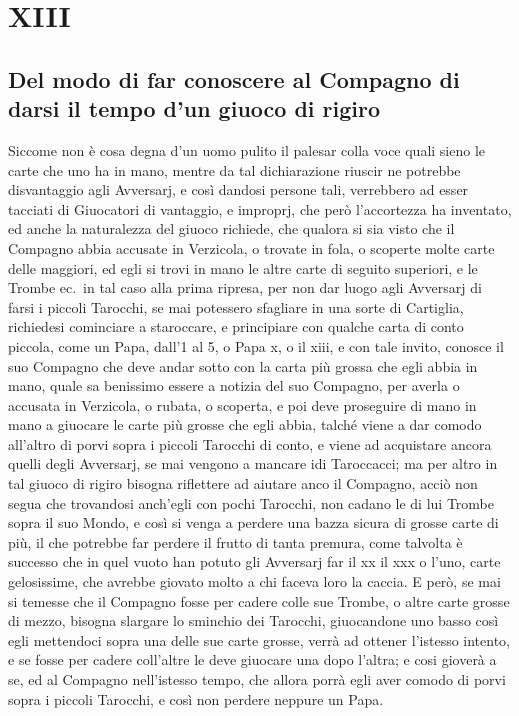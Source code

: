 \documentclass[11pt,a6paper]{article}
\begin{document}
\section{XIII}
\subsection*{Del modo di far conoscere al Compagno
di darsi il tempo d'un giuoco di rigiro}

Siccome non è cosa degna d'un uomo
pulito il palesar colla voce quali sieno le carte che uno ha in mano, mentre da tal dichiarazione riuscir ne potrebbe disvantaggio agli Avversarj, e così dandosi persone tali, verrebbero ad esser tacciati di Giuocatori di vantaggio, e improprj, che però l'accortezza ha inventato, ed anche la naturalezza del giuoco richiede, che qualora si sia visto che il Compagno abbia accusate in Verzicola, o trovate in fola, o scoperte molte carte delle maggiori, ed egli si trovi in mano le altre carte di seguito superiori, e le Trombe ec.\ in tal caso alla prima ripresa, per non dar luogo agli Avversarj di
farsi i piccoli Tarocchi, se mai potessero sfagliare in una sorte di Cartiglia, richiedesi cominciare a staroccare, e principiare con qualche carta di conto piccola, come un Papa, dall'1 al 5, o Papa x, o il xiii, e con tale invito, conosce il suo Compagno che deve andar sotto con la carta più grossa che egli abbia in mano, quale sa benissimo essere a notizia del suo Compagno, per averla o accusata in Verzicola, o rubata, o scoperta, e poi deve proseguire di mano in mano a giuocare le carte più grosse che egli abbia, talché viene a dar comodo all'altro di porvi sopra i piccoli Tarocchi di conto, e viene ad acquistare ancora quelli degli Avversarj, se mai vengono a mancare idi Taroccacci; ma per altro in tal giuoco di rigiro bisogna riflettere ad aiutare anco il Compagno, acciò non segua che trovandosi anch'egli con pochi Tarocchi, non cadano le di lui Trombe sopra il suo Mondo, e così si venga a perdere una bazza sicura di grosse carte di più, il che potrebbe far perdere il frutto di tanta premura, come talvolta è successo che in quel vuoto han potuto gli Avversarj
far il xx il xxx o l'uno, carte gelosissime, che avrebbe giovato molto a chi 
faceva loro la caccia. E però, se mai si 
temesse che il Compagno fosse per cadere colle sue Trombe, o altre carte grosse 
di mezzo, bisogna slargare lo sminchio 
dei Tarocchi, giuocandone uno basso 
così egli mettendoci sopra una delle sue 
carte grosse, verrà ad ottener l'istesso intento, e se fosse per cadere coll'altre le 
deve giuocare una dopo l'altra; e cosi 
gioverà a se, ed al Compagno nell'istesso 
tempo, che allora porrà egli aver comodo di porvi sopra i piccoli Tarocchi, e 
così non perdere neppure un Papa. 
\end{document}
